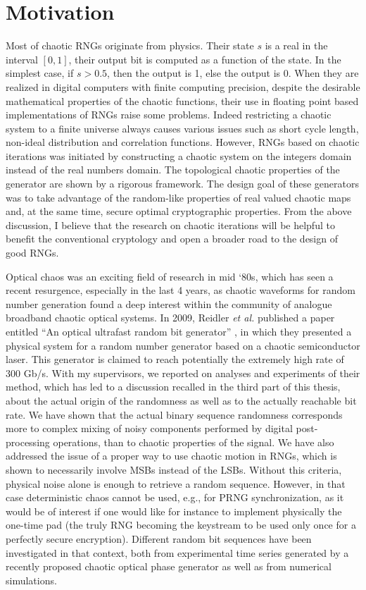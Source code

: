 \section{Motivation}
Most of chaotic RNGs originate from physics. Their state $s$ is a real in the interval  $[0 , 1]$, their output bit is computed as a function of the state. In the simplest case, if $ s>0.5 $, then the output is 1, else the output is 0. When they are realized in digital computers with finite computing precision, despite the desirable mathematical properties of the chaotic functions, their use in floating point based implementations of RNGs raise some problems. Indeed restricting a chaotic system to a finite universe always causes various issues such as short cycle length, non-ideal distribution and correlation functions. However, RNGs based on chaotic iterations was initiated by constructing a chaotic system on the integers domain instead of the real numbers domain. The topological chaotic properties of the generator are shown by a 
rigorous framework. The design goal of these generators was to take advantage of the random-like properties of real valued chaotic maps and, at the same time, secure optimal cryptographic properties. From the above discussion, I believe that the research on chaotic iterations will be helpful to benefit the conventional cryptology and open a broader road to the design of good RNGs. 

Optical chaos was an exciting field of research in mid `80s, which has seen a recent resurgence, especially in the last 4 years, as chaotic waveforms for random number generation found a deep interest within the community of analogue broadband chaotic optical systems. In 2009, Reidler \emph{et al.} published a paper entitled ``An optical ultrafast random bit generator'' \cite{ultrafast2009}, in which they presented a physical system for a random number generator based on a chaotic semiconductor laser. This generator is claimed to reach potentially the extremely high rate of 300 Gb/s. With my supervisors, we reported on analyses and experiments of their method, which has led to a discussion recalled in the third part of this thesis, about the actual origin of the randomness as well as to the actually reachable bit rate. We have shown that the actual binary sequence randomness corresponds more to complex mixing of noisy components performed by digital post-processing operations, than to chaotic properties of 
the signal. We have also addressed the issue of a proper 
way to use chaotic motion in RNGs, which is shown to necessarily involve MSBs instead of the LSBs. Without this criteria, physical noise alone is enough to retrieve a random sequence. However, in that case deterministic chaos cannot be used, e.g., for PRNG synchronization, as it would be of interest if one would like for instance to implement physically the one-time pad (the truly RNG becoming the keystream to be used only once for a perfectly secure encryption). Different random bit sequences have been investigated in that context, both from experimental time series generated by a recently proposed chaotic optical phase generator as well as from numerical simulations.

